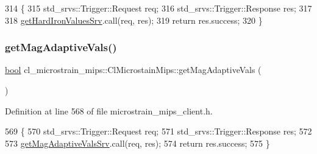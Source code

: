 \begin{DoxyCode}
314     \{
315         std\_srvs::Trigger::Request req;
316         std\_srvs::Trigger::Response res;
317 
318         \hyperlink{classcl__microstrain__mips_1_1ClMicrostainMips_a11169f770102e9cff7f3b45c96fb4881}{getHardIronValuesSrv}.call(req, res);
319         \textcolor{keywordflow}{return} res.success;
320     \}
\end{DoxyCode}
\mbox{\label{classcl__microstrain__mips_1_1ClMicrostainMips_a704dbe24f752c360b09c82234d4c928f}} 
\subsubsection{\texorpdfstring{get\+Mag\+Adaptive\+Vals()}{getMagAdaptiveVals()}}
{\footnotesize\ttfamily \hyperlink{classbool}{bool} cl\+\_\+microstrain\+\_\+mips\+::\+Cl\+Microstain\+Mips\+::get\+Mag\+Adaptive\+Vals (\begin{DoxyParamCaption}{ }\end{DoxyParamCaption})\hspace{0.3cm}{\ttfamily [inline]}}



Definition at line 568 of file microstrain\+\_\+mips\+\_\+client.\+h.


\begin{DoxyCode}
569     \{
570         std\_srvs::Trigger::Request req;
571         std\_srvs::Trigger::Response res;
572 
573         \hyperlink{classcl__microstrain__mips_1_1ClMicrostainMips_a799d76ddd2e92c3624d51ffb7c4b8c89}{getMagAdaptiveValsSrv}.call(req, res);
574         \textcolor{keywordflow}{return} res.success;
575     \}
\end{DoxyCode}
\mbox{\label{classcl__microstrain__mips_1_1ClMicrostainMips_ae3642065001bd0bac34d300d5e40f6a1}} 
